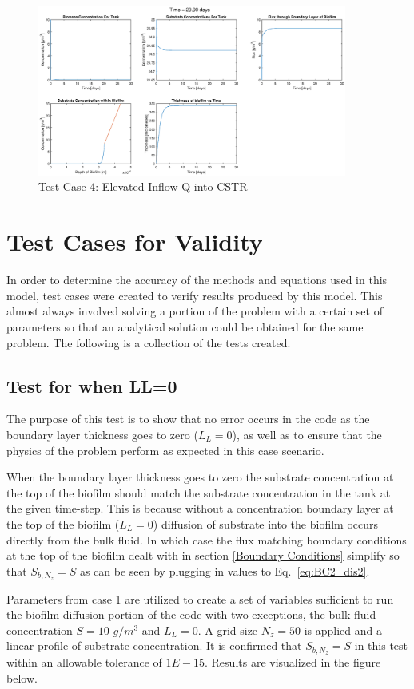 \documentclass[letterpaper, twoside]{article}
\numberwithin{equation}{section}
\begin{document}
\begin{figure}[H]
  \centering
  \includegraphics[read=eps, width=4in]{Testcase4_figure.eps}
  \caption{Test Case 4: Elevated Inflow Q into CSTR}
\end{figure}

\section{Test Cases for Validity}
In order to determine the accuracy of the methods and equations used in this model, test cases were created to verify results produced by this model. This almost always involved solving a portion of the problem with a certain set of parameters so that an analytical solution could be obtained for the same problem. The following is a collection of the tests created.

\subsection{Test for when LL=0}
The purpose of this test is to show that no error occurs in the code as the boundary layer thickness goes to zero ($L_L=0$), as well as to ensure that the physics of the problem perform as expected in this case scenario.

When the boundary layer thickness goes to zero the substrate concentration at the top of the biofilm should match the substrate concentration in the tank at the given time-step. This is because without a concentration boundary layer at the top of the biofilm ($L_L=0$) diffusion of substrate into the biofilm occurs directly from the bulk fluid. In which case the flux matching boundary conditions at the top of the biofilm dealt with in section \ref{Boundary Conditions} simplify so that $S_{b,N_z}=S$ as can be seen by plugging in values to Eq.~\ref{eq:BC2_dis2}.

Parameters from case 1 are utilized to create a set of variables sufficient to run the biofilm diffusion portion of the code with two exceptions, the bulk fluid concentration $S=10$ $g/m^3$ and $L_L=0$. A grid size $N_z=50$ is applied and a linear profile of substrate concentration. It is confirmed that $S_{b,N_z}=S$ in this test within an allowable tolerance of $1E-15$. Results are visualized in the figure below.
\end{document}
